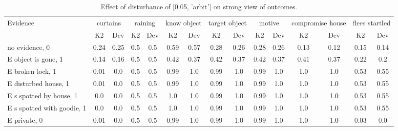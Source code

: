\begin{table}\begin{tabular}{l|cc|cc|cc|cc|cc|cc|cc}\toprule\multirow{2}{*}{Evidence} & \multicolumn{2}{c}{curtains}& \multicolumn{2}{c}{raining}& \multicolumn{2}{c}{know object}& \multicolumn{2}{c}{target object}& \multicolumn{2}{c}{motive}& \multicolumn{2}{c}{compromise house}& \multicolumn{2}{c}{flees startled}\\& {K2} & {Dev}& {K2} & {Dev}& {K2} & {Dev}& {K2} & {Dev}& {K2} & {Dev}& {K2} & {Dev}& {K2} & {Dev}\\\midrule
no evidence, 0 & 0.24&0.25&0.5&0.5&0.59&0.57&0.28&0.26&0.28&0.26&0.13&0.12&0.15&0.14\\E object is gone, 1 & 0.14&0.16&0.5&0.5&0.42&0.37&0.42&0.37&0.42&0.37&0.41&0.37&0.22&0.2\\E broken lock, 1 & 0.01&0.0&0.5&0.5&0.99&1.0&0.99&1.0&0.99&1.0&1.0&1.0&0.53&0.55\\E disturbed house, 1 & 0.01&0.0&0.5&0.5&0.99&1.0&0.99&1.0&0.99&1.0&1.0&1.0&0.53&0.55\\E s spotted by house, 1 & 0.0&0.0&0.5&0.5&1.0&1.0&0.99&1.0&0.99&1.0&1.0&1.0&0.53&0.55\\E s spotted with goodie, 1 & 0.0&0.0&0.5&0.5&1.0&1.0&0.99&1.0&0.99&1.0&1.0&1.0&0.53&0.55\\E private, 0 & 0.01&0.0&0.5&0.5&0.99&1.0&0.99&1.0&0.99&1.0&1.0&1.0&0.03&0.0\\\bottomrule\end{tabular}\caption{Effect of disturbance of [0.05, 'arbit'] on strong view of outcomes.}\end{table}